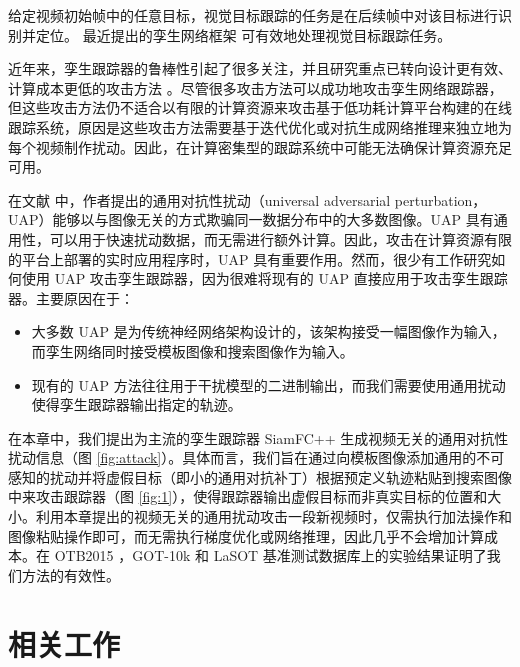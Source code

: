 给定视频初始帧中的任意目标，视觉目标跟踪的任务是在后续帧中对该目标进行识别并定位。
最近提出的孪生网络框架 \cite{SiamFC,SiamRPN,SiamRPN++,SiamFC++} 可有效地处理视觉目标跟踪任务。

近年来，孪生跟踪器的鲁棒性引起了很多关注，并且研究重点已转向设计更有效、计算成本更低的攻击方法 \cite{TTP,FAN,SPARK}。尽管很多攻击方法可以成功地攻击孪生网络跟踪器，但这些攻击方法仍不适合以有限的计算资源来攻击基于低功耗计算平台构建的在线跟踪系统，原因是这些攻击方法需要基于迭代优化或对抗生成网络推理来独立地为每个视频制作扰动。因此，在计算密集型的跟踪系统中可能无法确保计算资源充足可用。

在文献 \cite{UAP} 中，作者提出的通用对抗性扰动（universal adversarial perturbation，UAP）能够以与图像无关的方式欺骗同一数据分布中的大多数图像。UAP 具有通用性，可以用于快速扰动数据，而无需进行额外计算。因此，攻击在计算资源有限的平台上部署的实时应用程序时，UAP 具有重要作用。然而，很少有工作研究如何使用 UAP 攻击孪生跟踪器，因为很难将现有的 UAP 直接应用于攻击孪生跟踪器。主要原因在于：
\begin{itemize}
\item 大多数 UAP 是为传统神经网络架构设计的，该架构接受一幅图像作为输入，而孪生网络同时接受模板图像和搜索图像作为输入。
\item 现有的 UAP 方法往往用于干扰模型的二进制输出，而我们需要使用通用扰动使得孪生跟踪器输出指定的轨迹。
\end{itemize}

在本章中，我们提出为主流的孪生跟踪器 SiamFC++ \cite{SiamFC++} 生成视频无关的通用对抗性扰动信息（图 \ref{fig:attack}）。具体而言，我们旨在通过向模板图像添加通用的不可感知的扰动并将虚假目标（即小的通用对抗补丁）根据预定义轨迹粘贴到搜索图像中来攻击跟踪器（图 \ref{fig:1}），使得跟踪器输出虚假目标而非真实目标的位置和大小。利用本章提出的视频无关的通用扰动攻击一段新视频时，仅需执行加法操作和图像粘贴操作即可，而无需执行梯度优化或网络推理，因此几乎不会增加计算成本。在 OTB2015 \cite{OTB2015}，GOT-10k \cite{GOT-10k} 和 LaSOT \cite{LaSOT} 基准测试数据库上的实验结果证明了我们方法的有效性。
\section{相关工作}

